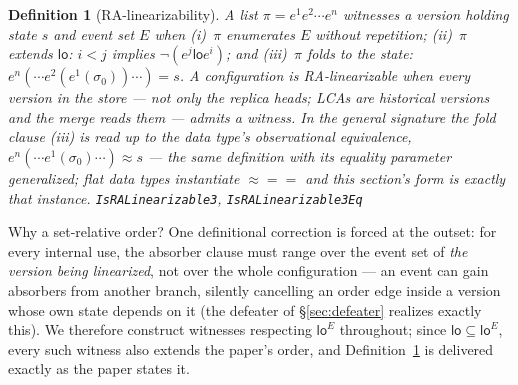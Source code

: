 \documentclass[11pt]{article}
\newtheorem{definition}[theorem]{Definition}
\newcommand{\Sinit}{\sigma_0}
\newcommand{\loE}[1]{\mathsf{lo}^{#1}}
\newcommand{\lean}[1]{\texttt{#1}}
\newcommand{\eqobs}{\approx}
\begin{document}
\begin{definition}[RA-linearizability]
\label{def:ralin}
A list $\pi = e^1 e^2 \cdots e^n$ \emph{witnesses} a version holding
state $s$ and event set $E$ when (i)~$\pi$ enumerates $E$ without
repetition; (ii)~$\pi$ \emph{extends} $\mathsf{lo}$: $i < j$ implies
$\neg(e^j \mathrel{\mathsf{lo}} e^i)$; and (iii)~$\pi$ \emph{folds} to
the state: $e^n(\cdots e^2(e^1(\Sinit))\cdots) = s$. A configuration is
\emph{RA-linearizable} when \emph{every version in the store} --- not
only the replica heads; LCAs are historical versions and the merge reads
them --- admits a witness. In the general signature the fold clause
(iii) is read up to the data type's observational equivalence,
$e^n(\cdots e^1(\Sinit)\cdots) \eqobs s$ --- the same definition with
its equality parameter generalized; flat data types instantiate
${\eqobs} = {=}$ and this section's form is exactly that instance.
\hfill\lean{IsRALinearizable3}, \lean{IsRALinearizable3Eq}
\end{definition}

Why a set-relative order? One definitional correction is forced at the
outset: for every internal use, the absorber clause must range over the
event set of \emph{the version being linearized}, not over the whole
configuration --- an event can gain absorbers from another branch,
silently cancelling an order edge inside a version whose own state
depends on it (the defeater of \S\ref{sec:defeater} realizes exactly
this). We therefore construct witnesses respecting $\loE{E}$ throughout;
since $\mathsf{lo} \subseteq \loE{E}$, every such witness also extends
the paper's order, and Definition~\ref{def:ralin} is delivered exactly
as the paper states it.
\end{document}
